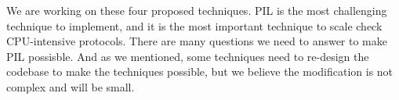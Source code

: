 We are working on these four proposed techniques. PIL is the most challenging
technique to implement, and it is the most important technique to scale check
CPU-intensive protocols. There are many questions we need to answer to make PIL
possisble.
%
And as we mentioned, some techniques need to re-design the codebase to make the
techniques possible, but we believe the modification is not complex and will be
small.

